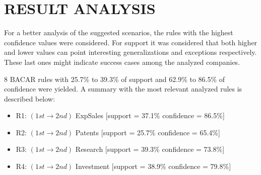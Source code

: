 \documentclass[a4paper,twoside]{article}
\begin{document}
\section{\uppercase{Result Analysis}}

For a better analysis of the suggested scenarios, the rules with the highest confidence values were considered. For support it was considered that both higher and lower values can point interesting generalizations and exceptions respectively. These last ones might indicate success cases among the analyzed companies.

8 BACAR rules with 25.7\% to 39.3\% of support and 62.9\% to 86.5\% of confidence were yielded. A summary with the most relevant analyzed rules is described below:

\begin{itemize}
    \item R1: $( 1st \to 2nd )$ ExpSales [support = 37.1\% confidence = 86.5\%]
    \item R2: $( 1st \to 2nd )$ Patents [support = 25.7\% confidence = 65.4\%]
    \item R3: $( 1st \to 2nd )$ Research [support = 39.3\% confidence = 73.8\%]
    \item R4: $( 1st \to 2nd )$ Investment [support = 38.9\% confidence = 79.8\%]
\end{itemize}
\end{document}
